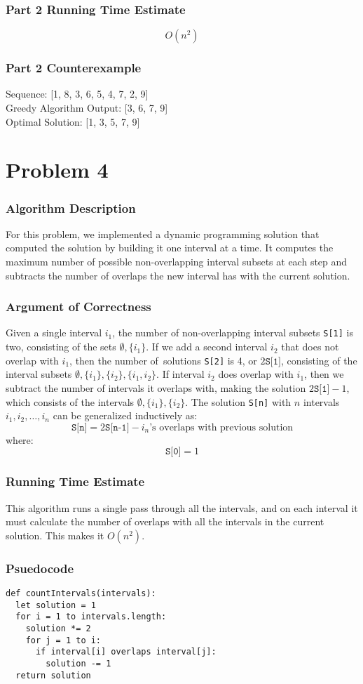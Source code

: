 \documentclass[letterpaper, 12pt]{math}
\begin{document}
\subsubsection*{Part 2 Running Time Estimate}
\[ O(n^2) \]

\subsubsection*{Part 2 Counterexample}
Sequence: [1, 8, 3, 6, 5, 4, 7, 2, 9] \\
Greedy Algorithm Output: [3, 6, 7, 9] \\
Optimal Solution: [1, 3, 5, 7, 9]

\section*{Problem 4}

\subsubsection*{Algorithm Description}
For this problem, we implemented a dynamic programming solution that computed
the solution by building it one interval at a time. It computes the maximum
number of possible non-overlapping interval subsets at each step and subtracts
the number of overlaps the new interval has with the current solution.

\subsubsection*{Argument of Correctness}
Given a single interval \( i_1 \), the number of non-overlapping interval
subsets \texttt{S[1]} is two, consisting of the sets \( \emptyset,\{i_1\} \).
If we add a second interval \( i_2 \) that does not overlap with \( i_1 \),
then the number of\ solutions \texttt{S[2]} is 4, or \( 2\texttt{S[1]} \),
consisting of the interval subsets \( \emptyset,\{i_1\},\{i_2\},\{i_1,i_2\} \).
If interval \( i_2 \) does overlap with \( i_1 \), then we subtract the number
of intervals it overlaps with, making the solution \( 2\texttt{S[1]}-1 \), which
consists of the intervals \( \emptyset,\{i_1\},\{i_2\} \). The solution
\texttt{S[n]} with \( n \) intervals \( i_1,i_2,\dots,i_n \) can be
generalized inductively as:
\[ \texttt{S[n]} =
  2\texttt{S[n-1]}-i_n\text{'s overlaps with previous solution} \]
where:
\[ \texttt{S[0]} = 1 \]

\subsubsection*{Running Time Estimate}
This algorithm runs a single pass through all the intervals, and on each
interval it must calculate the number of overlaps with all the intervals in
the current solution. This makes it \( O(n^2) \).

\subsubsection*{Psuedocode}
\begin{lstlisting}
def countIntervals(intervals):
  let solution = 1
  for i = 1 to intervals.length:
    solution *= 2
    for j = 1 to i:
      if interval[i] overlaps interval[j]:
        solution -= 1
  return solution
\end{lstlisting}
\end{document}
